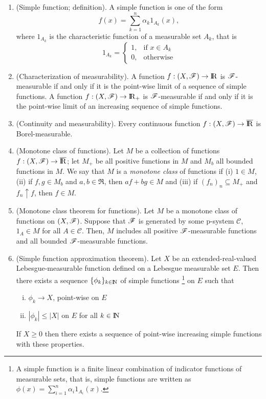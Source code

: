 \documentclass[a4paper,10pt]{scrbook}
\begin{document}
\begin{enumerate}
 \item (Simple function; definition). A simple function is one of the form
	\[
	 f(x) = \sum_{k=1}^{n}\alpha_k 1_{A_k}(x),
	\]
	where $1_{A_k}$ is the characteristic function of a measurable set $A_k$, that is
	\[
	 1_{A_k} = \begin{cases}
	            1,&\text{if }x\in A_{k}\\
	            0,&\text{otherwise}
	           \end{cases}
	\]



 \item (Characterization of measurability). A function $f:(X,\F)\to\Re$ is $\mathscr{F}$-measurable if and only if 
       it is the point-wise limit of a sequence of simple functions. A function $f:(X,\F)\to\Re_+$ is 
       $\mathscr{F}$-measurable if and only if  it is the point-wise limit of an increasing sequence of simple functions. 
       
 \item (Continuity and measurability). Every continuous function $f:(X,\F)\to\barre$ is Borel-measurable. 
  
 \item (Monotone class of functions). Let $M$ be a collection of functions $f:(X,\F)\to\barre$; let $M_+$
       be all positive functions in $M$ and $M_b$ all bounded functions in $M$. We say that $M$ is a \textit{monotone class}
       of functions if (i) $1\in M$, (ii) if $f,g\in M_b$ and $a,b\in \Re$, then $af+bg\in M$ and (iii)
       if $(f_n)_n\subseteq M_+$ and $f_n \uparrow f$, then $f\in M$.
       
 \item (Monotone class theorem for functions). Let $M$ be a monotone class of functions on $(X,\mathscr{F})$. Suppose 
       that $\mathscr{F}$ is generated by some p-system $\mathcal{C}$, $1_A \in M$ for all $A\in\mathcal{C}$.
       Then, $M$ includes all positive $\mathscr{F}$-measurable functions and all bounded $\mathscr{F}$-measurable functions. 
       
 \item (Simple function approximation theorem).       
        Let $X$ be an extended-real-valued Lebesgue-measurable function defined on a Lebesgue measurable set $E$. 
        Then there exists a sequence $\{\phi_k\}_{k\in\N}$ of simple functions%
	    \footnote{A simple function is a finite linear combination of indicator functions of measurable sets, that is, 
	              simple functions are written as $\phi(x)=\sum_{i=1}^{n}\alpha_i 1_{A_i}(x)$. }
	 on $E$ such that
	\begin{enumerate}[i.]
	 \item $\phi_k\to X$, point-wise on $E$
	 \item $|\phi_k| \leq |X|$ on $E$ for all $k\in\N$
	\end{enumerate}
       If $X\geq 0$ then there exists a sequence of point-wise increasing simple functions with these properties.
       

\end{enumerate}
\end{document}
